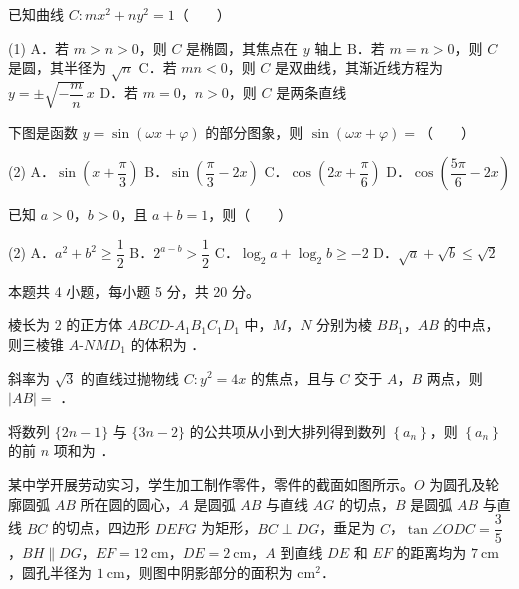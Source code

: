 已知曲线 $C:mx^{2}+ny^{2}=1$（　　）

\begin{gkopts}(1)
\task A．若 $m>n>0$，则 $C$ 是椭圆，其焦点在 $y$ 轴上
\task B．若 $m=n>0$，则 $C$ 是圆，其半径为 $\sqrt n$
\task C．若 $mn<0$，则 $C$ 是双曲线，其渐近线方程为 $y=\pm\sqrt{-\dfrac mn}\,x$
\task D．若 $m=0$，$n>0$，则 $C$ 是两条直线
\end{gkopts}

下图是函数 $y=\sin(\omega x+\varphi)$ 的部分图象，则 $\sin(\omega x+\varphi)=$（　　）

\begin{center}\end{center}

\begin{gkopts}(2)
\task A．$\sin\left(x+\dfrac\pi3\right)$
\task B．$\sin\left(\dfrac\pi3-2x\right)$
\task C．$\cos\left(2x+\dfrac\pi6\right)$
\task D．$\cos\left(\dfrac{5\pi}6-2x\right)$
\end{gkopts}

已知 $a>0$，$b>0$，且 $a+b=1$，则（　　）

\begin{gkopts}(2)
\task A．$a^{2}+b^{2}\ge\dfrac12$
\task B．$2^{a-b}>\dfrac12$
\task C．$\log_2a+\log_2b\ge-2$
\task D．$\sqrt a+\sqrt b\le\sqrt2$
\end{gkopts}

\par\medskip


\begin{gktip}
本题共 4 小题，每小题 5 分，共 20 分。
\end{gktip}

棱长为 $2$ 的正方体 $ABCD\text{-}A_1B_1C_1D_1$ 中，$M$，$N$ 分别为棱 $BB_1$，$AB$ 的中点，则三棱锥 $A\text{-}NMD_1$ 的体积为 \gkblank{}．

斜率为 $\sqrt3$ 的直线过抛物线 $C:y^{2}=4x$ 的焦点，且与 $C$ 交于 $A$，$B$ 两点，则 $|AB|=$ \gkblank{}．

将数列 $\{2n-1\}$ 与 $\{3n-2\}$ 的公共项从小到大排列得到数列 $\left\{a_n\right\}$，则 $\left\{a_n\right\}$ 的前 $n$ 项和为 \gkblank{}．

某中学开展劳动实习，学生加工制作零件，零件的截面如图所示。$O$ 为圆孔及轮廓圆弧 $AB$ 所在圆的圆心，$A$ 是圆弧 $AB$ 与直线 $AG$ 的切点，$B$ 是圆弧 $AB$ 与直线 $BC$ 的切点，四边形 $DEFG$ 为矩形，$BC\perp DG$，垂足为 $C$，$\tan\angle ODC=\dfrac35$，$BH\parallel DG$，$EF=12\ \mathrm{cm}$，$DE=2\ \mathrm{cm}$，$A$ 到直线 $DE$ 和 $EF$ 的距离均为 $7\ \mathrm{cm}$，圆孔半径为 $1\ \mathrm{cm}$，则图中阴影部分的面积为 \gkblank{} $\mathrm{cm}^{2}$．

